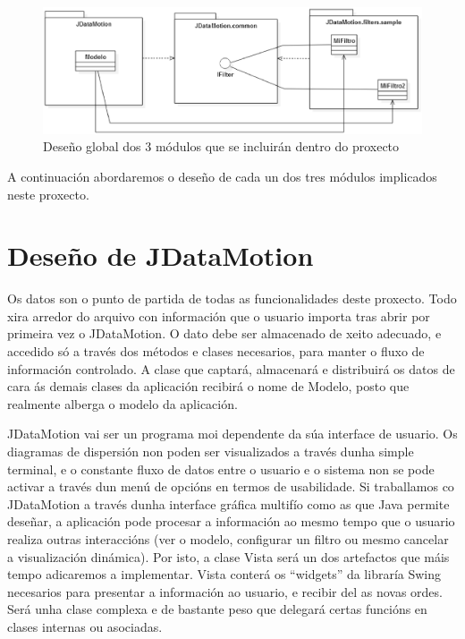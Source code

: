 \begin{figure}
\centering
\includegraphics[width=\textwidth,height=\textheight,keepaspectratio]{figuras/disenhoGlobal}
\caption{Deseño global dos 3 módulos que se incluirán dentro do proxecto}
\label{disenhoGlobal}
\end{figure}

A continuación abordaremos o deseño de cada un dos tres módulos implicados neste proxecto.

\section{Deseño de JDataMotion}

Os datos son o punto de partida de todas as funcionalidades deste proxecto. Todo xira arredor do arquivo con información que o usuario importa tras abrir por primeira vez o JDataMotion. O dato debe ser almacenado de xeito adecuado, e accedido só a través dos métodos e clases necesarios, para manter o fluxo de información controlado. A clase que captará, almacenará e distribuirá os datos de cara ás demais clases da aplicación recibirá o nome de Modelo, posto que realmente alberga o modelo da aplicación.

JDataMotion vai ser un programa moi dependente da súa interface de usuario. Os diagramas de dispersión non poden ser visualizados a través dunha simple terminal, e o constante fluxo de datos entre o usuario e o sistema non se pode activar a través dun menú de opcións en termos de usabilidade. Si traballamos co JDataMotion a través dunha interface gráfica multifío como as que Java permite deseñar, a aplicación pode procesar a información ao mesmo tempo que o usuario realiza outras interaccións (ver o modelo, configurar un filtro ou mesmo cancelar a visualización dinámica). Por isto, a clase Vista será un dos artefactos que máis tempo adicaremos a implementar. Vista conterá os ``widgets'' da libraría Swing necesarios para presentar a información ao usuario, e recibir del as novas ordes. Será unha clase complexa e de bastante peso que delegará certas funcións en clases internas ou asociadas.

